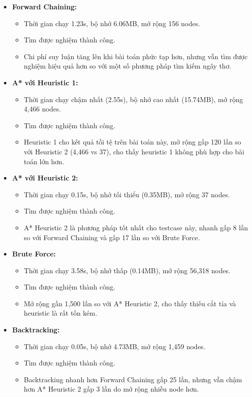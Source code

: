 \begin{itemize}
\item \textbf{Forward Chaining:}
\begin{itemize}
    \item Thời gian chạy 1.23s, bộ nhớ 6.06MB, mở rộng 156 nodes.
    \item Tìm được nghiệm thành công.
    \item Chi phí suy luận tăng lên khi bài toán phức tạp hơn, nhưng vẫn tìm được nghiệm hiệu quả hơn so với một số phương pháp tìm kiếm ngây thơ.
\end{itemize}

\item \textbf{A* với Heuristic 1:}
\begin{itemize}
    \item Thời gian chạy chậm nhất (2.55s), bộ nhớ cao nhất (15.74MB), mở rộng 4,466 nodes.
    \item Tìm được nghiệm thành công.
    \item Heuristic 1 cho kết quả tồi tệ trên bài toán này, mở rộng gấp 120 lần so với Heuristic 2 (4,466 vs 37), cho thấy heuristic 1 không phù hợp cho bài toán lớn hơn.
\end{itemize}

\item \textbf{A* với Heuristic 2:}
\begin{itemize}
    \item Thời gian chạy 0.15s, bộ nhớ tối thiểu (0.35MB), mở rộng 37 nodes.
    \item Tìm được nghiệm thành công.
    \item A* Heuristic 2 là phương pháp tốt nhất cho testcase này, nhanh gấp 8 lần so với Forward Chaining và gấp 17 lần so với Brute Force.
\end{itemize}

\item \textbf{Brute Force:}
\begin{itemize}
    \item Thời gian chạy 3.58s, bộ nhớ thấp (0.14MB), mở rộng 56,318 nodes.
    \item Tìm được nghiệm thành công.
    \item Mở rộng gần 1,500 lần so với A* Heuristic 2, cho thấy thiếu cắt tỉa và heuristic là rất tốn kém.
\end{itemize}

\item \textbf{Backtracking:}
\begin{itemize}
    \item Thời gian chạy 0.05s, bộ nhớ 4.73MB, mở rộng 1,459 nodes.
    \item Tìm được nghiệm thành công.
    \item Backtracking nhanh hơn Forward Chaining gấp 25 lần, nhưng vẫn chậm hơn A* Heuristic 2 gấp 3 lần do mở rộng nhiều node hơn.
\end{itemize}

\end{itemize}

